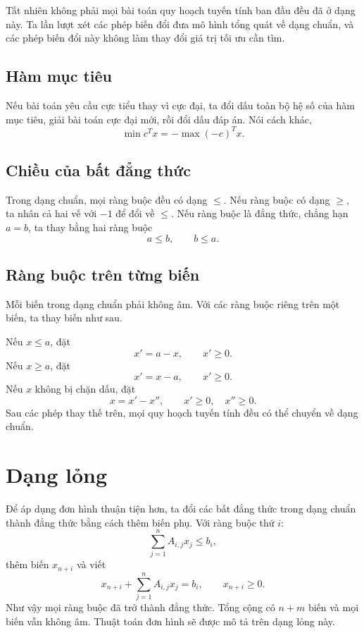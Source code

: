 \documentclass[11pt]{article}
\begin{document}
Tất nhiên không phải mọi bài toán quy hoạch tuyến tính ban đầu đều đã ở
dạng này. Ta lần lượt xét các phép biến đổi đưa mô hình tổng quát về dạng
chuẩn, và các phép biến đổi này không làm thay đổi giá trị tối ưu cần tìm.

\subsection{Hàm mục tiêu}

Nếu bài toán yêu cầu cực tiểu thay vì cực đại, ta đổi dấu toàn bộ hệ số của
hàm mục tiêu, giải bài toán cực đại mới, rồi đổi dấu đáp án. Nói cách khác,
\[
  \min c^T x = - \max (-c)^T x.
\]

\subsection{Chiều của bất đẳng thức}

Trong dạng chuẩn, mọi ràng buộc đều có dạng \(\le\). Nếu ràng buộc có dạng
\(\ge\), ta nhân cả hai vế với \(-1\) để đổi về \(\le\). Nếu ràng buộc là
đẳng thức, chẳng hạn \(a=b\), ta thay bằng hai ràng buộc
\[
  a\le b,\qquad b\le a.
\]

\subsection{Ràng buộc trên từng biến}

Mỗi biến trong dạng chuẩn phải không âm. Với các ràng buộc riêng trên một
biến, ta thay biến như sau.

Nếu \(x\le a\), đặt
\[
  x'=a-x,\qquad x'\ge 0.
\]
Nếu \(x\ge a\), đặt
\[
  x'=x-a,\qquad x'\ge 0.
\]
Nếu \(x\) không bị chặn dấu, đặt
\[
  x=x'-x'',\qquad x'\ge 0,\quad x''\ge 0.
\]
Sau các phép thay thế trên, mọi quy hoạch tuyến tính đều có thể chuyển về
dạng chuẩn.

\section{Dạng lỏng}

Để áp dụng đơn hình thuận tiện hơn, ta đổi các bất đẳng thức trong dạng
chuẩn thành đẳng thức bằng cách thêm biến phụ. Với ràng buộc thứ \(i\):
\[
  \sum_{j=1}^{n} A_{i,j}x_j \le b_i,
\]
thêm biến \(x_{n+i}\) và viết
\[
  x_{n+i}+\sum_{j=1}^{n} A_{i,j}x_j=b_i,\qquad x_{n+i}\ge 0.
\]
Như vậy mọi ràng buộc đã trở thành đẳng thức. Tổng cộng có \(n+m\) biến và
mọi biến vẫn không âm. Thuật toán đơn hình sẽ được mô tả trên dạng lỏng này.
\end{document}

